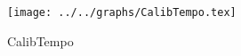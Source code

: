 \begin{figure}[h] \centering \texttt{[image: ../../graphs/CalibTempo.tex]}\caption{CalibTempo}\label{gr:CalibTempo} \end{figure}
